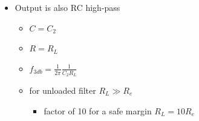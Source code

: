 \documentclass[beamer]{standalone}
\begin{document}
{\begin{columns}[t]
\begin{column}
\begin{itemize}
\begin{itemize}
\begin{itemize}
      \end{itemize}
    \end{itemize}
   \item<3-> Output is also RC high-pass
    \begin{itemize}
     \item $C=C_2$
     \item $R=R_L$
     \item $f_{3db}=\frac{1}{2 \pi} \frac{1}{C_2 R_L}$
     \item for unloaded filter $R_L \gg R_e$ 
      \begin{itemize}
       \item factor of 10 for a safe margin
        $R_L = 10 R_e$
      \end{itemize}
    \end{itemize}
  \end{itemize}
 \end{column}
\end{columns}
 
 }
 
\end{document}
